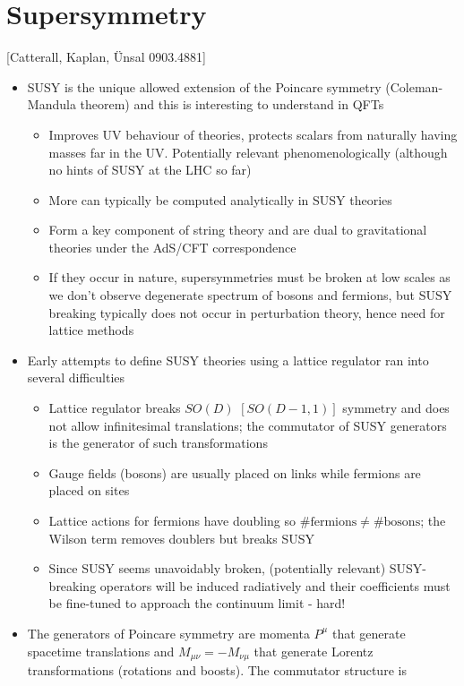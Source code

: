\newpage

\section{Supersymmetry}
[Catterall, Kaplan, Ünsal 0903.4881]
\begin{itemize}
    \item SUSY is the unique allowed extension of the Poincare symmetry (Coleman-Mandula theorem) and this is interesting to understand in QFTs
    \begin{itemize}
        \item Improves UV behaviour of theories, protects scalars from naturally having masses far in the UV. Potentially relevant phenomenologically (although no hints of SUSY at the LHC so far)
        \item More can typically be computed analytically in SUSY theories
        \item Form a key component of string theory and are dual to gravitational theories under the AdS/CFT correspondence
        \item If they occur in nature, supersymmetries must be broken at low scales as we don't observe degenerate spectrum of bosons and fermions, but SUSY breaking typically does not occur in perturbation theory, hence need for lattice methods
    \end{itemize}
    \item Early attempts to define SUSY theories using a lattice regulator ran into several difficulties
    \begin{itemize}
        \item Lattice regulator breaks $SO(D)$ $[SO(D-1,1)]$ symmetry and does not allow infinitesimal translations; the commutator of SUSY generators is the generator of such transformations
        \item Gauge fields (bosons) are usually placed on links while fermions are placed on sites
        \item Lattice actions for fermions have doubling so $\# \text{fermions} \neq \# \text{bosons}$; the Wilson term removes doublers but breaks SUSY
        \item Since SUSY seems unavoidably broken, (potentially relevant) SUSY-breaking operators will be induced radiatively and their coefficients must be fine-tuned to approach the continuum limit - hard!
    \end{itemize}
    \item The generators of Poincare symmetry are momenta $P^\mu$ that generate spacetime translations and $M_{\mu \nu} = -M_{\nu \mu}$ that generate Lorentz transformations (rotations and boosts). The commutator structure is
\end{itemize}

